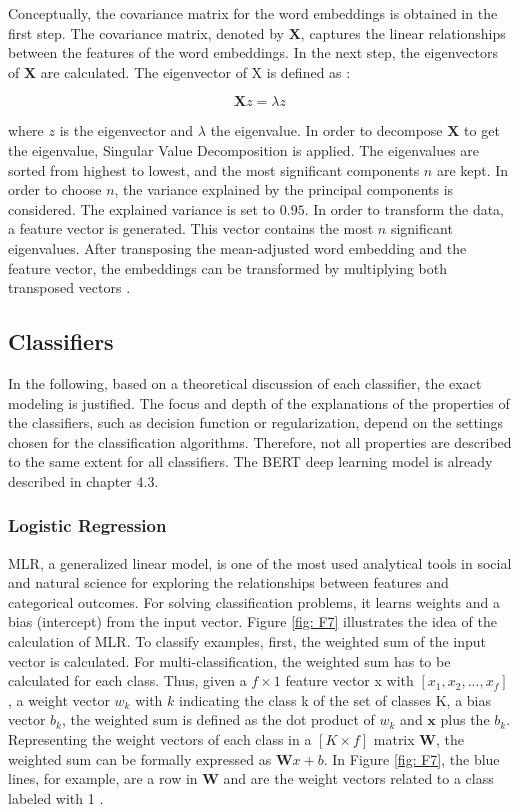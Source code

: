 \documentclass[12pt, a4paper, titlepage]{article}
\begin{document}
Conceptually, the covariance matrix for the word embeddings is obtained in the first step. The covariance matrix, denoted by $\textbf{X}$, captures the linear relationships between the features of the word embeddings. In the next step, the eigenvectors of $\textbf{X}$ are calculated. The eigenvector of X is defined as \citep{bro2014}: 

\[ \textbf{X}z = \lambda z \]

where $z$ is the eigenvector and $\lambda$ the eigenvalue. In order to decompose $\textbf{X}$ to get the eigenvalue, Singular Value Decomposition is applied. The eigenvalues are sorted from highest to lowest, and the most significant components $n$ are kept. In order to choose $n$, the variance explained by the principal components is considered. The explained variance is set to $0.95$. In order to transform the data, a feature vector is generated. This vector contains the most $n$ significant eigenvalues. After transposing the mean-adjusted word embedding and the feature vector, the embeddings can be transformed by multiplying both transposed vectors \citep{smith2002}. 

\subsection{Classifiers}
In the following, based on a theoretical discussion of each classifier, the exact modeling is justified. The focus and depth of the explanations of the properties of the classifiers, such as decision function or regularization, depend on the settings chosen for the classification algorithms. Therefore, not all properties are described to the same extent for all classifiers. The \ac{BERT} deep learning model is already described in chapter 4.3. 

\subsubsection{Logistic Regression}
\ac{MLR}, a generalized linear model, is one of the most used analytical tools in social and natural science for exploring the relationships between features and categorical outcomes. For solving classification problems, it learns weights and a bias (intercept) from the input vector. Figure \ref{fig: F7} illustrates the idea of the calculation of \ac{MLR}. To classify examples, first, the weighted sum of the input vector is calculated. For multi-classification, the weighted sum has to be calculated for each class. Thus, given a $f \times 1$ feature vector x with $[x_1, x_2, ..., x_f]$, a weight vector $w_k$ with $k$ indicating the class k of the set of classes K, a bias vector $b_k$, the weighted sum is defined as the dot product of $w_k$ and $\textbf{x}$ plus the $b_k$. Representing the weight vectors of each class in a $[K \times f]$ matrix $\textbf{W}$, the weighted sum can be formally expressed as $\textbf{W}x+b$. In Figure \ref{fig: F7}, the blue lines, for example, are a row in $\textbf{W}$ and are the weight vectors related to a class labeled with 1 \citep{jurafsky2021}.
\end{document}
